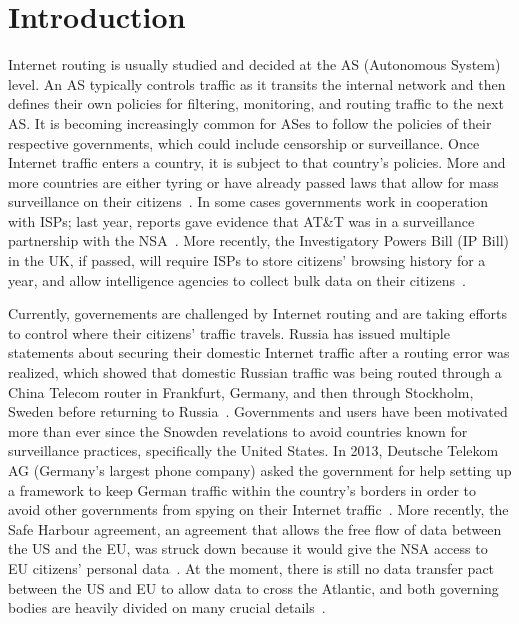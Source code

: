 \section{Introduction}
\label{intro}

Internet routing is usually studied and decided at the AS (Autonomous System) level.  An AS typically controls traffic as it transits the internal network and then defines their own policies for filtering, monitoring, and routing traffic to the next AS.  It is becoming increasingly common for ASes to follow the policies of their respective governments, which could include censorship or surveillance.  Once Internet traffic enters a country, it is subject to that country's policies.  More and more countries are either tyring or have already passed laws that allow for mass surveillance on their citizens~\cite{france_surveillance, netherlands_surveillance, kazak_surveillance}.  In some cases governments work in cooperation with ISPs; last year, reports gave evidence that AT\&T was in a surveillance partnership with the NSA~\cite{ATT_NSA}.  More recently, the Investigatory Powers Bill (IP Bill) in the UK, if passed, will require ISPs to store citizens' browsing history for a year, and allow intelligence agencies to collect bulk data on their citizens~\cite{uk_bill}.

Currently, governements are challenged by Internet routing and are taking efforts to control where their citizens' traffic travels.  Russia has issued multiple statements about securing their domestic Internet traffic after a routing error was realized, which showed that domestic Russian traffic was being routed through a China Telecom router in Frankfurt, Germany, and then through Stockholm, Sweden before returning to Russia~\cite{russia_secure_internet, routing_errors}.  Governments and users have been motivated more than ever since the Snowden revelations to avoid countries known for surveillance practices, specifically the United States.  In 2013, Deutsche Telekom AG (Germany's largest phone company) asked the government for help setting up a framework to keep German traffic within the country's borders in order to avoid other governments from spying on their Internet traffic~\cite{dte}.  More recently, the Safe Harbour agreement, an agreement that allows the free flow of data between the US and the EU, was struck down because it would give the NSA access to EU citizens' personal data~\cite{safe_harbour_illegal}.  At the moment, there is still no data transfer pact between the US and EU to allow data to cross the Atlantic, and both governing bodies are heavily divided on many crucial details~\cite{safe_harbour_undecided}.

